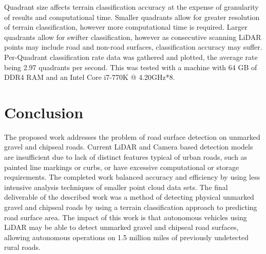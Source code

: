 \documentclass[journal,onecolumn]{IEEEtran}
\begin{document}
{	Quadrant size affects terrain classification accuracy at the expense of granularity of results and computational time. Smaller quadrants allow for greater resolution of terrain classification, however more computational time is required. Larger quadrants allow for swifter classification, however as consecutive scanning LiDAR points may include road and non-road surfaces, classification accuracy may suffer. Per-Quadrant classification rate data was gathered and plotted, the average rate being 2.97 quadrants per second. This was tested with a machine with 64 GB of DDR4 RAM and an Intel Core i7-770K @ 4.20GHz*8.


\section{Conclusion}
	
	The proposed work addresses the problem of road surface detection on unmarked gravel and chipseal roads. Current LiDAR and Camera based detection models are insufficient due to lack of distinct features typical of urban roads, such as painted line markings or curbs, or have excessive computational or storage requirements. The completed work balanced accuracy and efficiency by using less intensive analysis techniques of smaller point cloud data sets. The final deliverable of the described work was a method of detecting physical unmarked gravel and chipseal roads by using a terrain classification approach to predicting road surface area. The impact of this work is that autonomous vehicles using LiDAR may be able to detect unmarked gravel and chipseal road surfaces, allowing autonomous operations on 1.5 million miles of previously undetected rural roads.


%
\IEEEpeerreviewmaketitle





}
\end{document}
